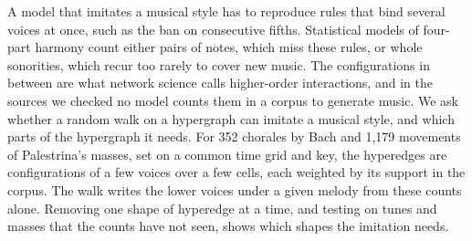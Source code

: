 A model that imitates a musical style has to reproduce rules that bind several voices at once, such as the ban on consecutive fifths. Statistical models of four-part harmony count either pairs of notes, which miss these rules, or whole sonorities, which recur too rarely to cover new music. The configurations in between are what network science calls higher-order interactions, and in the sources we checked no model counts them in a corpus to generate music. We ask whether a random walk on a hypergraph can imitate a musical style, and which parts of the hypergraph it needs.  For 352 chorales by Bach and 1,179 movements of Palestrina's masses, set on a common time grid and key, the hyperedges are configurations of a few voices over a few cells, each weighted by its support in the corpus. The walk writes the lower voices under a given melody from these counts alone. Removing one shape of hyperedge at a time, and testing on tunes and masses that the counts have not seen, shows which shapes the imitation needs. 
